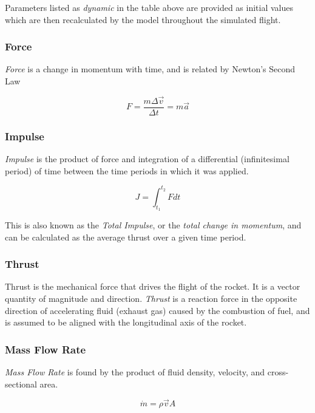 \documentclass[]{article}
\begin{document}
Parameters listed as \emph{dynamic} in the table above are provided as
initial values which are then recalculated by the model throughout the
simulated flight.

\subsubsection{Force}\label{force}

\emph{Force} is a change in momentum with time, and is related by
Newton's Second Law

\begin{equation}
F = \dfrac{m \Delta \vec{v}}{\Delta t} = m\vec{a}
\end{equation}

\subsubsection{Impulse}\label{impulse}

\emph{Impulse} is the product of force and integration of a differential
(infinitesimal period) of time between the time periods in which it was
applied.

\begin{equation}
\label{impulse}
J = \int^{t_2}_{t_1} F dt
\end{equation}

This is also known as the \emph{Total Impulse}, or the \emph{total
change in momentum}, and can be calculated as the average thrust over a
given time period.

\subsubsection{Thrust}\label{thrust}

Thrust is the mechanical force that drives the flight of the rocket. It
is a vector quantity of magnitude and direction. \emph{Thrust} is a
reaction force in the opposite direction of accelerating fluid (exhaust
gas) caused by the combustion of fuel, and is assumed to be aligned with
the longitudinal axis of the rocket.

\subsubsection{Mass Flow Rate}\label{mass-flow-rate}

\emph{Mass Flow Rate} is found by the product of fluid density,
velocity, and cross-sectional area.

\begin{equation} 
\dot{m} = \rho \vec{v} A
\end{equation}
\end{document}
